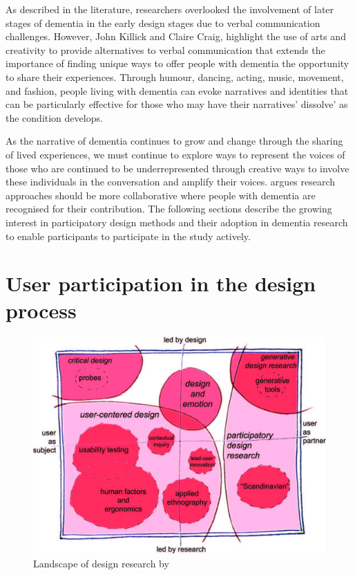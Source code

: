 As described in the literature, researchers overlooked the involvement of later stages of dementia in the early design stages due to verbal communication challenges. However, John Killick and Claire Craig, highlight the use of arts and creativity to provide alternatives to verbal communication that extends the importance of finding unique ways to offer people with dementia the opportunity to share their experiences. Through humour, dancing, acting, music, movement, and fashion, people living with dementia can evoke narratives and identities that can be particularly effective for those who may have their narratives' dissolve' as the condition develops.

As the narrative of dementia continues to grow and change through the sharing of lived experiences, we must continue to explore ways to represent the voices of those who are continued to be underrepresented through creative ways to involve these individuals in the conversation and amplify their voices. \cite{swarbrick2015quest} argues research approaches should be more collaborative where people with dementia are recognised for their contribution. The following sections describe the growing interest in participatory design methods and their adoption in dementia research to enable participants to participate in the study actively. 


\section{User participation in the design process}
\label{ParticipationDesignProcess}

\begin{figure}[htp]
    \centering
    \includegraphics[width=0.8\linewidth]{Images/Methodology/Landscape_of_Design.jpg}
    \caption{Landscape of design research by  \citep{sanders2008co}}
    \label{fig:LandscapeOfDesign}
\end{figure}

